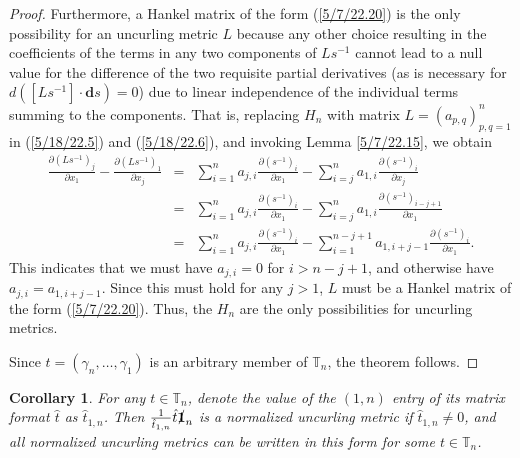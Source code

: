 \documentclass{amsart}
\newtheorem{corollary}[theorem]{Corollary}
\theoremstyle{definition}
\numberwithin{theorem}{section}
\numberwithin{equation}{section}
\begin{document}
\begin{proof}
Furthermore, a Hankel matrix of the form (\ref{5/7/22.20}) is the only possibility for an uncurling metric $L$ because any other choice resulting in the coefficients of the terms in any two components of $Ls^{-1}$ cannot lead to a null value for the difference of the two requisite partial derivatives (as is necessary for $d\left([L s^{-1}]\cdot \mathbf{d}s\right) = 0$) due to linear independence of the individual terms summing to the components. That is, replacing  $H_n$ with matrix $L=(a_{p,q})_{p,q=1}^n$ in (\ref{5/18/22.5}) 
and (\ref{5/18/22.6}), and invoking Lemma \ref{5/7/22.15}, we obtain
\begin{eqnarray}\nonumber \frac{\partial \left(L s^{-1}\right)_j}{\partial x_1}  -  \frac{\partial \left(L s^{-1}\right)_1}{\partial x_j} &=&  \sum_{i=1}^n a_{j,i}\frac{\partial \left(s^{-1}\right)_i}{\partial x_1} - \sum_{i=j}^n a_{1,i}\frac{\partial \left(s^{-1}\right)_i}{\partial x_j} \\  &=& \sum_{i=1}^n a_{j,i}\frac{\partial \left(s^{-1}\right)_i}{\partial x_1} - \sum_{i=j}^n a_{1,i}\frac{\partial \left(s^{-1}\right)_{i-j+1}}{\partial x_1} \nonumber \\
&=& \sum_{i=1}^n a_{j,i}\frac{\partial \left(s^{-1}\right)_i}{\partial x_1} - \sum_{i=1}^{n-j+1} a_{1,i+j-1}\frac{\partial \left(s^{-1}\right)_i}{\partial x_1}.
\label{5/9/22.10}
\end{eqnarray}
This indicates that we must have $a_{j,i}=0$ for $i>n-j+1$, and otherwise have $a_{j,i} = a_{1,i+j-1}$.  Since this must hold for any $j>1$, $L$ must be a Hankel matrix of the form (\ref{5/7/22.20}).  Thus, the $H_n$ are the only possibilities for uncurling metrics. 

Since $t=(\gamma_n,\dots,\gamma_1)$ is an arbitrary member of $\mathbb{T}_n$, the theorem follows.
\end{proof}

\begin{corollary}\label{7/1/22.1} For any $t\in \mathbb{T}_n$, denote the value of the $(1,n)$ entry of its matrix format $\hat{t}$ as $\hat{t}_{1,n}$.  Then $\frac{1}{\hat{t}_{1,n}}\hat{t}\slashed{\bf 1}_n$ is a normalized uncurling metric if $\hat{t}_{1,n}\ne 0$, and all normalized uncurling metrics can be written in this form for some $t\in \mathbb{T}_n$. \end{corollary}
\end{document}
